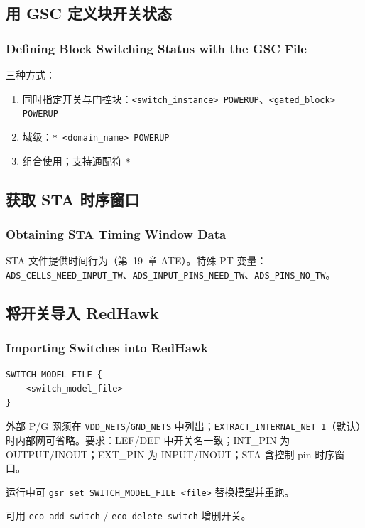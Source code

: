 \subsection{用 GSC 定义块开关状态}
\subsubsection*{Defining Block Switching Status with the GSC File}

三种方式：
\begin{enumerate}
  \item 同时指定开关与门控块：\texttt{<switch\_instance> POWERUP}、\texttt{<gated\_block> POWERUP}
  \item 域级：\texttt{* <domain\_name> POWERUP}
  \item 组合使用；支持通配符 \texttt{*}
\end{enumerate}

\subsection{获取 STA 时序窗口}
\subsubsection*{Obtaining STA Timing Window Data}

STA 文件提供时间行为（第~19~章 ATE）。特殊 PT 变量：\texttt{ADS\_CELLS\_NEED\_INPUT\_TW}、\texttt{ADS\_INPUT\_PINS\_NEED\_TW}、\texttt{ADS\_PINS\_NO\_TW}。

\subsection{将开关导入 RedHawk}
\subsubsection*{Importing Switches into RedHawk}

\begin{lstlisting}
SWITCH_MODEL_FILE {
    <switch_model_file>
}
\end{lstlisting}

外部 P/G 网须在 \texttt{VDD\_NETS}/\texttt{GND\_NETS} 中列出；\texttt{EXTRACT\_INTERNAL\_NET 1}（默认）时内部网可省略。要求：LEF/DEF 中开关名一致；INT\_PIN 为 OUTPUT/INOUT；EXT\_PIN 为 INPUT/INOUT；STA 含控制 pin 时序窗口。

运行中可 \texttt{gsr set SWITCH\_MODEL\_FILE <file>} 替换模型并重跑。

可用 \texttt{eco add switch} / \texttt{eco delete switch} 增删开关。

